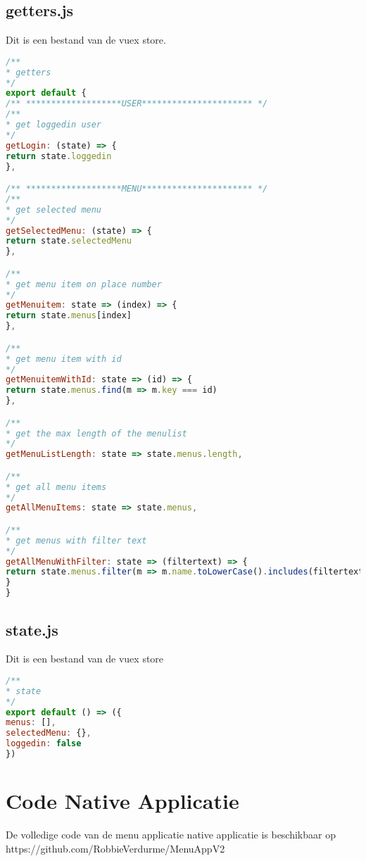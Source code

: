\section{getters.js}
Dit is een bestand van de vuex store.
\begin{lstlisting}[caption= store getters.js, language= Javascript]
/**
* getters
*/
export default {
/** *******************USER********************** */
/**
* get loggedin user
*/
getLogin: (state) => {
return state.loggedin
},

/** *******************MENU********************** */
/**
* get selected menu
*/
getSelectedMenu: (state) => {
return state.selectedMenu
},

/**
* get menu item on place number
*/
getMenuitem: state => (index) => {
return state.menus[index]
},

/**
* get menu item with id
*/
getMenuitemWithId: state => (id) => {
return state.menus.find(m => m.key === id)
},

/**
* get the max length of the menulist
*/
getMenuListLength: state => state.menus.length,

/**
* get all menu items
*/
getAllMenuItems: state => state.menus,

/**
* get menus with filter text
*/
getAllMenuWithFilter: state => (filtertext) => {
return state.menus.filter(m => m.name.toLowerCase().includes(filtertext.toLowerCase()) || m.ingredients.find(i => i.name.toLowerCase().includes(filtertext.toLowerCase())))
}
}

\end{lstlisting}

\section{state.js}
Dit is een bestand van de vuex store

\begin{lstlisting}[caption= store state.js ,language=Javascript]
/**
* state
*/
export default () => ({
menus: [],
selectedMenu: {},
loggedin: false
})

\end{lstlisting}

\chapter{Code Native Applicatie}
De volledige code van de menu applicatie native applicatie is beschikbaar op https://github.com/RobbieVerdurme/MenuAppV2

